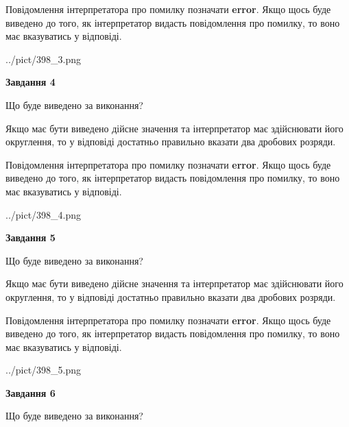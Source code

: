 \documentclass[12pt, ukrainian]{article}
\begin{document}
{\begin {Large}
Повідомлення інтерпретатора про помилку позначати \textbf{error}.
Якщо щось буде виведено до того, як інтерпретатор видасть повідомлення про помилку, 
то воно має вказуватись у відповіді. \par

\begin{center}
	{../pict/398_3.png}
\end{center}
\newpage

{\begin {center}\textbf{Завдання 4}\end {center}}\par
Що буде виведено за виконання? \par

Якщо має бути виведено дійсне значення та інтерпретатор має здійснювати його округлення, 
то у відповіді достатньо правильно вказати два дробових розряди.

Повідомлення інтерпретатора про помилку позначати \textbf{error}.
Якщо щось буде виведено до того, як інтерпретатор видасть повідомлення про помилку, 
то воно має вказуватись у відповіді. \par

\begin{center}
	{../pict/398_4.png}
\end{center}
\newpage

{\begin {center}\textbf{Завдання 5}\end {center}}\par
Що буде виведено за виконання? \par

Якщо має бути виведено дійсне значення та інтерпретатор має здійснювати його округлення, 
то у відповіді достатньо правильно вказати два дробових розряди.

Повідомлення інтерпретатора про помилку позначати \textbf{error}.
Якщо щось буде виведено до того, як інтерпретатор видасть повідомлення про помилку, 
то воно має вказуватись у відповіді. \par

\begin{center}
	{../pict/398_5.png}
\end{center}
\newpage

{\begin {center}\textbf{Завдання 6}\end {center}}\par
Що буде виведено за виконання? \par


\end{Large}}
\end{document}
